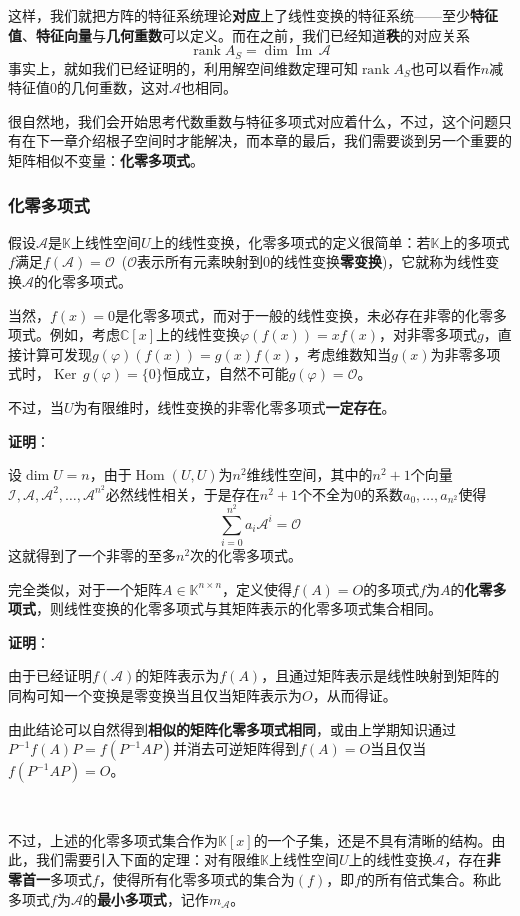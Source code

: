 \documentclass[a4paper,UTF8,fontset=windows,AutoFakeBold]{ctexart}
\DeclareMathOperator{\rank}{rank}
\DeclareMathOperator{\im}{Im\,}
\DeclareMathOperator{\Ker}{Ker\,}
\DeclareMathOperator{\Hom}{Hom}
\newcommand*{\ma}{\mathcal{A}}
\newcommand*{\mi}{\mathcal{I}}
\newcommand*{\mo}{\mathcal{O}}
\newcommand*{\note}{\noindent *}
\newcommand{\proo}[1]{{\vspace{5pt}\kaishu\noindent\textbf{证明}：\vspace{-3pt}
\begin{compactitem}
    \item[] #1
\end{compactitem}
}}
\begin{document}
这样，我们就把方阵的特征系统理论\textbf{对应}上了线性变换的特征系统——至少\textbf{特征值}、\textbf{特征向量}与\textbf{几何重数}可以定义。而在之前，我们已经知道\textbf{秩}的对应关系
$$\rank A_S=\dim\im\ma$$
事实上，就如我们已经证明的，利用解空间维数定理可知$\rank A_S$也可以看作$n$减特征值0的几何重数，这对$\ma$也相同。

很自然地，我们会开始思考代数重数与特征多项式对应着什么，不过，这个问题只有在下一章介绍根子空间时才能解决，而本章的最后，我们需要谈到另一个重要的矩阵相似不变量：\textbf{化零多项式}。

\subsubsection{化零多项式}
假设$\ma$是$\mathbb{K}$上线性空间$U$上的线性变换，化零多项式的定义很简单：若$\mathbb{K}$上的多项式$f$满足$f(\ma)=\mo$\ ($\mo$表示所有元素映射到0的线性变换\textbf{零变换})，它就称为线性变换$\ma$的化零多项式。

当然，$f(x)=0$是化零多项式，而对于一般的线性变换，未必存在非零的化零多项式。例如，考虑$\mathbb{C}[x]$上的线性变换$\varphi(f(x))=xf(x)$，对非零多项式$g$，直接计算可发现$g(\varphi)(f(x))=g(x)f(x)$，考虑维数知当$g(x)$为非零多项式时，$\Ker g(\varphi)=\{0\}$恒成立，自然不可能$g(\varphi)=\mo$。

不过，当$U$为有限维时，线性变换的非零化零多项式\textbf{一定存在}。

\proo{
    设$\dim U=n$，由于$\Hom(U,U)$为$n^2$维线性空间，其中的$n^2+1$个向量$\mi,\ma,\ma^2,\dots,\ma^{n^2}$必然线性相关，于是存在$n^2+1$个不全为0的系数$a_0,\dots,a_{n^2}$使得
    $$\sum_{i=0}^{n^2}a_i\ma^i=\mo$$
    这就得到了一个非零的至多$n^2$次的化零多项式。
}

完全类似，对于一个矩阵$A\in\mathbb{K}^{n\times n}$，定义使得$f(A)=O$的多项式$f$为$A$的\textbf{化零多项式}，则线性变换的化零多项式与其矩阵表示的化零多项式集合相同。

\proo{
    由于已经证明$f(\ma)$的矩阵表示为$f(A)$，且通过矩阵表示是线性映射到矩阵的同构可知一个变换是零变换当且仅当矩阵表示为$O$，从而得证。
}

\note 由此结论可以自然得到\textbf{相似的矩阵化零多项式相同}，或由上学期知识通过$P^{-1}f(A)P=f(P^{-1}AP)$并消去可逆矩阵得到$f(A)=O$当且仅当$f(P^{-1}AP)=O$。

\

不过，上述的化零多项式集合作为$\mathbb{K}[x]$的一个子集，还是不具有清晰的结构。由此，我们需要引入下面的定理：对有限维$\mathbb{K}$上线性空间$U$上的线性变换$\ma$，存在\textbf{非零首一}多项式$f$，使得所有化零多项式的集合为$(f)$，即$f$的所有倍式集合。称此多项式$f$为$\ma$的\textbf{最小多项式}，记作$m_\ma$。
\end{document}
